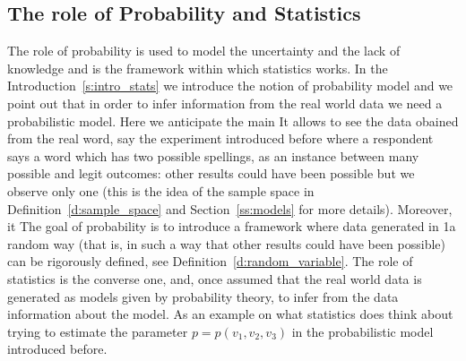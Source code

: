 \subsection{ The role of Probability and Statistics}	
	The role of probability is used to model the uncertainty and the lack of knowledge and is the framework within which statistics works. In the Introduction~\ref{s:intro_stats} we introduce the notion of probability model and we point out that in order to infer information from the real world data we need a probabilistic model. Here we anticipate the main 
	  It allows to see the data obained from the real word, say the experiment introduced before where a respondent says a word which has two possible spellings, as an instance between many possible and legit outcomes: other results could have been possible but we observe only one (this is the idea of the sample space in Definition~\ref{d:sample_space} and Section~\ref{ss:models} for more details). Moreover, it The goal of probability is to introduce a framework where data generated in 1a random way (that is, in such a way that other results could have been possible) can be rigorously defined, see Definition~\ref{d:random_variable}. The role of statistics is the converse one, and, once assumed that the real world data is generated as models given by probability theory, to infer from the data information about the model.
As an example on what statistics does think about trying to estimate the parameter $p = p(v_1,v_2, v_3)$ in the probabilistic model introduced before. 


